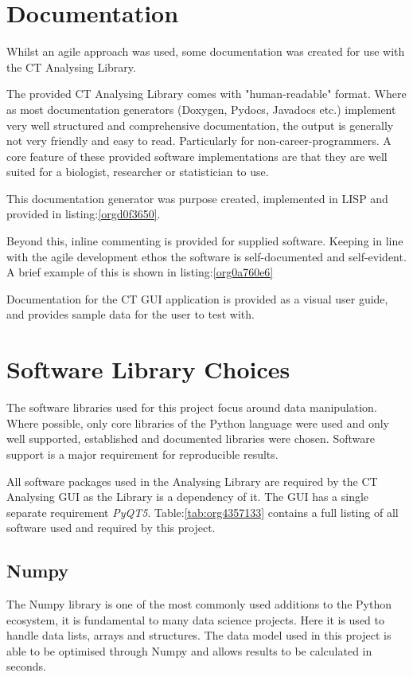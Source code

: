 \documentclass[11pt]{report}
\begin{document}
\section{Documentation}
\label{sec:orge55ea40}
Whilst an agile approach was used, some documentation was created for use with the CT Analysing Library.

The provided CT Analysing Library comes with "human-readable" format. Where as most documentation generators (Doxygen, Pydocs, Javadocs etc.) implement very well structured and comprehensive documentation, the output is generally not very friendly and easy to read. Particularly for non-career-programmers. A core feature of these provided software implementations are that they are well suited for a biologist, researcher or statistician to use.

This documentation generator was purpose created, implemented in LISP and provided in listing:\ref{orgd0f3650}.

Beyond this, inline commenting is provided for supplied software. Keeping in line with the agile development ethos the software is self-documented and self-evident. A brief example of this is shown in listing:\ref{org0a760e6}

Documentation for the CT GUI application is provided as a visual user guide, and provides sample data for the user to test with.
\section{Software Library Choices}
\label{sec:org44f1773}
The software libraries used for this project focus around data manipulation. Where possible, only core libraries of the Python language were used and only well supported, established and documented libraries were chosen. Software support is a major requirement for reproducible results.

All software packages used in the Analysing Library are required by the CT Analysing GUI as the Library is a dependency of it. The GUI has a single separate requirement \emph{PyQT5}.
Table:\ref{tab:org4357133} contains a full listing of all software used and required by this project.
\subsection{Numpy}
\label{sec:org547c7a7}
The Numpy library is one of the most commonly used additions to the Python ecosystem, it is fundamental to many data science projects. Here it is used to handle data lists, arrays and structures. The data model used in this project is able to be optimised through Numpy and allows results to be calculated in seconds.
\end{document}
